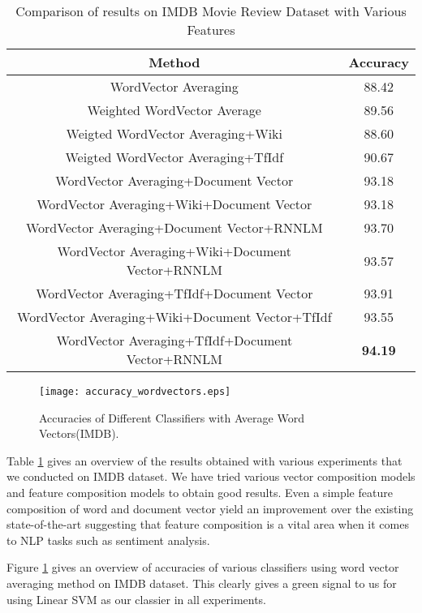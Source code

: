 \begin {table}[H]
\centering
\begin{tabular}{ | c | c | }
\hline
\textbf{Method} & \textbf{Accuracy} \\ \hline
WordVector Averaging & 88.42\\ \hline
Weighted WordVector Average & 89.56\\ \hline
Weigted WordVector Averaging+Wiki & 88.60\\ \hline
Weigted WordVector Averaging+TfIdf & 90.67\\ \hline
WordVector Averaging+Document Vector & 93.18\\ \hline
WordVector Averaging+Wiki+Document Vector & 93.18\\ \hline
WordVector Averaging+Document Vector+RNNLM & 93.70\\ \hline
WordVector Averaging+Wiki+Document Vector+RNNLM & 93.57\\ \hline
WordVector Averaging+TfIdf+Document Vector & 93.91\\ \hline
WordVector Averaging+Wiki+Document Vector+TfIdf & 93.55\\ \hline
WordVector Averaging+TfIdf+Document Vector+RNNLM & \textbf{94.19}\\ \hline
\end{tabular}
\caption {Comparison of results on IMDB Movie Review Dataset with Various Features}
\label{table:IMDB_features}
\end{table}

\begin{figure}[H]
\centering
\texttt{[image: accuracy\_wordvectors.eps]}
\caption{Accuracies of Different Classifiers with Average Word Vectors(IMDB). \label{fig:accuracy_wordvectors}}
\end{figure}

Table \ref{table:IMDB_features} gives an overview of the results obtained with various experiments that we conducted on IMDB dataset. We have tried various vector composition models and feature composition models to obtain good results. Even a simple feature composition of word and document vector yield an improvement over the existing state-of-the-art suggesting that feature composition is a vital area when it comes to NLP tasks such as sentiment analysis.

Figure \ref{fig:accuracy_wordvectors} gives an overview of accuracies of various classifiers using word vector averaging method on IMDB dataset. This clearly gives a green signal to us for using Linear SVM as our classier in all experiments.




